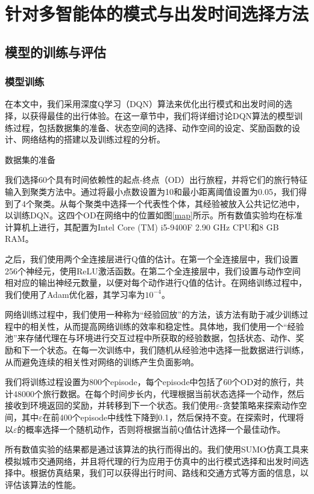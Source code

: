 \chapter{针对多智能体的模式与出发时间选择方法}
\label{chp:bib}

\section{模型的训练与评估}


\subsection{模型训练}

在本文中，我们采用深度Q学习（DQN）算法来优化出行模式和出发时间的选择，以获得最佳的出行体验。在这一章节中，我们将详细讨论DQN算法的模型训练过程，包括数据集的准备、状态空间的选择、动作空间的设定、奖励函数的设计、网络结构的搭建以及训练过程的分析。

数据集的准备

我们选择60个具有时间依赖性的起点-终点（OD）出行旅程，并将它们的旅行特征输入到聚类方法中。通过将最小点数设置为10和最小距离阈值设置为0.05，我们得到了4个聚类。从每个聚类中选择一个代表性个体，其经验被放入公共记忆池中，以训练DQN。这四个OD在网络中的位置如图\ref{map}所示。所有数值实验均在标准计算机上进行，其配置为Intel Core (TM) i5-9400F 2.90 GHz CPU和8 GB RAM。

之后，我们使用两个全连接层进行Q值的估计。在第一个全连接层中，我们设置256个神经元，使用ReLU激活函数。在第二个全连接层中，我们设置与动作空间相对应的输出神经元数量，以便对每个动作进行Q值的估计。在网络训练过程中，我们使用了Adam优化器，其学习率为$10^{-4}$。

网络训练过程中，我们使用一种称为“经验回放”的方法，该方法有助于减少训练过程中的相关性，从而提高网络训练的效率和稳定性。具体地，我们使用一个“经验池”来存储代理在与环境进行交互过程中所获取的经验数据，包括状态、动作、奖励和下一个状态。在每一次训练中，我们随机从经验池中选择一批数据进行训练，从而避免连续的相关性对网络的训练产生负面影响。

我们将训练过程设置为800个episode，每个episode中包括了60个OD对的旅行，共计48000个旅行数据。在每个时间步长内，代理根据当前状态选择一个动作，然后接收到环境返回的奖励，并转移到下一个状态。我们使用$\varepsilon$-贪婪策略来探索动作空间，其中$\varepsilon$在前400个episode中线性下降到0.1，然后保持不变。在探索时，代理将以$\varepsilon$的概率选择一个随机动作，否则将根据当前Q值估计选择一个最佳动作。

所有数值实验的结果都是通过该算法的执行而得出的。我们使用SUMO仿真工具来模拟城市交通网络，并且将代理的行为应用于仿真中的出行模式选择和出发时间选择中。根据仿真结果，我们可以获得出行时间、路线和交通方式等方面的信息，以评估该算法的性能。

